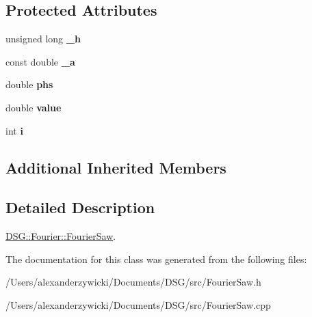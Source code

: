 \subsection*{Protected Attributes}
\begin{DoxyCompactItemize}
\item 
\hypertarget{class_d_s_g_1_1_fourier_1_1_fourier_saw_a78d30240b7eb99fcb249b5aafe3d55b2}{unsigned long {\bfseries \+\_\+h}}\label{class_d_s_g_1_1_fourier_1_1_fourier_saw_a78d30240b7eb99fcb249b5aafe3d55b2}

\item 
\hypertarget{class_d_s_g_1_1_fourier_1_1_fourier_saw_a54895160b61b8d84dc967e7815d07869}{const double {\bfseries \+\_\+a}}\label{class_d_s_g_1_1_fourier_1_1_fourier_saw_a54895160b61b8d84dc967e7815d07869}

\item 
\hypertarget{class_d_s_g_1_1_fourier_1_1_fourier_saw_a5df3e5b00224924e106ffdc1d0b6a3cc}{double {\bfseries phs}}\label{class_d_s_g_1_1_fourier_1_1_fourier_saw_a5df3e5b00224924e106ffdc1d0b6a3cc}

\item 
\hypertarget{class_d_s_g_1_1_fourier_1_1_fourier_saw_a97d69a0c03cfb66b1cf6e13fe7073c12}{double {\bfseries value}}\label{class_d_s_g_1_1_fourier_1_1_fourier_saw_a97d69a0c03cfb66b1cf6e13fe7073c12}

\item 
\hypertarget{class_d_s_g_1_1_fourier_1_1_fourier_saw_a261b19d0082558b6e1bb128d267c400d}{int {\bfseries i}}\label{class_d_s_g_1_1_fourier_1_1_fourier_saw_a261b19d0082558b6e1bb128d267c400d}

\end{DoxyCompactItemize}
\subsection*{Additional Inherited Members}


\subsection{Detailed Description}
\hyperlink{class_d_s_g_1_1_fourier_1_1_fourier_saw}{D\+S\+G\+::\+Fourier\+::\+Fourier\+Saw}. 

The documentation for this class was generated from the following files\+:\begin{DoxyCompactItemize}
\item 
/\+Users/alexanderzywicki/\+Documents/\+D\+S\+G/src/Fourier\+Saw.\+h\item 
/\+Users/alexanderzywicki/\+Documents/\+D\+S\+G/src/Fourier\+Saw.\+cpp\end{DoxyCompactItemize}
